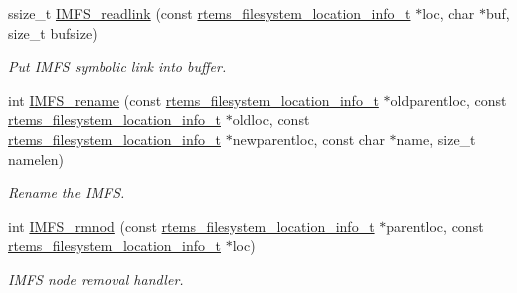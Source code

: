 \begin{DoxyCompactItemize}
ssize\+\_\+t \mbox{\hyperlink{group__IMFS_gaf65f51402a7c595b2308e1fbc0f1c9f0}{I\+M\+F\+S\+\_\+readlink}} (const \mbox{\hyperlink{group__LibIO_ga3252b3d31ee3c49ffff0b7604a676864}{rtems\+\_\+filesystem\+\_\+location\+\_\+info\+\_\+t}} $\ast$loc, char $\ast$buf, size\+\_\+t bufsize)
\begin{DoxyCompactList}\small\item\em Put I\+M\+FS symbolic link into buffer. \end{DoxyCompactList}\item 
int \mbox{\hyperlink{group__IMFS_ga36af606732f5f7b5695c9608816f5a39}{I\+M\+F\+S\+\_\+rename}} (const \mbox{\hyperlink{group__LibIO_ga3252b3d31ee3c49ffff0b7604a676864}{rtems\+\_\+filesystem\+\_\+location\+\_\+info\+\_\+t}} $\ast$oldparentloc, const \mbox{\hyperlink{group__LibIO_ga3252b3d31ee3c49ffff0b7604a676864}{rtems\+\_\+filesystem\+\_\+location\+\_\+info\+\_\+t}} $\ast$oldloc, const \mbox{\hyperlink{group__LibIO_ga3252b3d31ee3c49ffff0b7604a676864}{rtems\+\_\+filesystem\+\_\+location\+\_\+info\+\_\+t}} $\ast$newparentloc, const char $\ast$name, size\+\_\+t namelen)
\begin{DoxyCompactList}\small\item\em Rename the I\+M\+FS. \end{DoxyCompactList}\item 
int \mbox{\hyperlink{group__IMFS_ga1d854875d4ebede5e6497809b647dec1}{I\+M\+F\+S\+\_\+rmnod}} (const \mbox{\hyperlink{group__LibIO_ga3252b3d31ee3c49ffff0b7604a676864}{rtems\+\_\+filesystem\+\_\+location\+\_\+info\+\_\+t}} $\ast$parentloc, const \mbox{\hyperlink{group__LibIO_ga3252b3d31ee3c49ffff0b7604a676864}{rtems\+\_\+filesystem\+\_\+location\+\_\+info\+\_\+t}} $\ast$loc)
\begin{DoxyCompactList}\small\item\em I\+M\+FS node removal handler. \end{DoxyCompactList}\end{DoxyCompactItemize}
